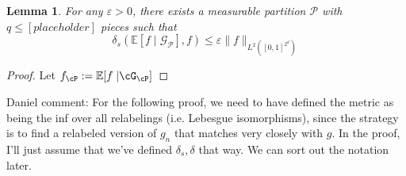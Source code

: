 \documentclass[11pt,oneside,reqno]{article}
\theoremstyle{plain}
\newtheorem{lemma}[theorem]{Lemma}
\theoremstyle{definition}
\numberwithin{equation}{section}
\renewcommand{\leq}{\leqslant}
\newcommand{\E}{\mathbb{E}}
\newcommand{\daniel}[1]{\textcolor{Emerald}{Daniel comment: #1}}
\begin{document}
\begin{lemma} \label{lem:approximation_by_step_fn}
    For any $\varepsilon > 0$, there exists a measurable partition $\mathcal P$ with $q \leq [placeholder]$ pieces such that
    $$\delta_s(\E[f \mid \mathcal G_{\mathcal P}],f) \leq \varepsilon \| f \|_{L^2([0,1]^{2^d})}$$
\end{lemma}

\begin{proof}
    Let $f_\cP := \E [f \; | \cG_\cP]$
\end{proof}


\daniel{For the following proof, we need to have defined the metric as being the inf over all relabelings (i.e. Lebesgue isomorphisms), since  the strategy is to find a relabeled version of $g_n$ that matches very closely with $g$. In the proof, I'll just assume that we've defined $\delta_s,\delta$ that way. We can sort out the notation later.}
\end{document}
